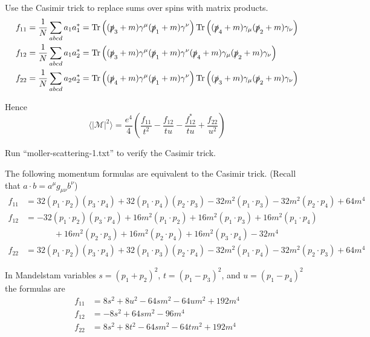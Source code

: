 \documentclass[12pt]{article}
\begin{document}
\noindent
Use the Casimir trick to replace sums over spins with matrix products.
\begin{align*}
f_{11}&=\frac{1}{N}\sum_{abcd}a_1a_1^*=
\mathop{\rm Tr}\left(
(\slashed{p}_3+m)\gamma^\mu(\slashed{p}_1+m)\gamma^\nu
\right)
\mathop{\rm Tr}\left(
(\slashed{p}_4+m)\gamma_\mu(\slashed{p}_2+m)\gamma_\nu
\right)
\\
f_{12}&=\frac{1}{N}\sum_{abcd}a_1a_2^*=
\mathop{\rm Tr}\left(
(\slashed{p}_3+m)\gamma^\mu(\slashed{p}_1+m)\gamma^\nu
(\slashed{p}_4+m)\gamma_\mu(\slashed{p}_2+m)\gamma_\nu
\right)
\\
f_{22}&=\frac{1}{N}\sum_{abcd}a_2a_2^*=
\mathop{\rm Tr}\left(
(\slashed{p}_4+m)\gamma^\mu(\slashed{p}_1+m)\gamma^\nu
\right)
\mathop{\rm Tr}\left(
(\slashed{p}_3+m)\gamma_\mu(\slashed{p}_2+m)\gamma_\nu
\right)
\end{align*}

\noindent
Hence
\begin{equation*}
\langle|\mathcal{M}|^2\rangle
=\frac{e^4}{4}
\left(
\frac{f_{11}}{t^2}-\frac{f_{12}}{tu}-\frac{f_{12}^*}{tu}+\frac{f_{22}}{u^2}
\right)
\end{equation*}

\noindent
Run ``moller-scattering-1.txt'' to verify the Casimir trick.

\bigskip
\noindent
The following momentum formulas are equivalent to the Casimir trick.
(Recall that $a\cdot b=a^\mu g_{\mu\nu}b^\nu$)
\begin{align*}
f_{11}&=
32 (p_1\cdot p_2) (p_3\cdot p_4) +
32 (p_1\cdot p_4) (p_2\cdot p_3) -
32 m^2 (p_1\cdot p_3) -
32 m^2 (p_2\cdot p_4) +
64 m^4
\\
f_{12}&=
-32 (p_1\cdot p_2) (p_3\cdot p_4)
+ 16 m^2 (p_1\cdot p_2) + 16 m^2 (p_1\cdot p_3) + 16 m^2 (p_1\cdot p_4) \\
&\phantom{=}\qquad{} + 16 m^2 (p_2\cdot p_3) + 16 m^2 (p_2\cdot p_4) + 16 m^2 (p_3\cdot p_4) - 32 m^4
\\
f_{22}&=
32 (p_1\cdot p_2) (p_3\cdot p_4) +
32 (p_1\cdot p_3) (p_2\cdot p_4) -
32 m^2 (p_1\cdot p_4) -
32 m^2 (p_2\cdot p_3) +
64 m^4
\end{align*}

\noindent
In Mandelstam variables $s=(p_1+p_2)^2$, $t=(p_1-p_3)^2$, and $u=(p_1-p_4)^2$ the formulas are
\begin{align*}
f_{11} &= 8 s^2 + 8 u^2 - 64 s m^2 - 64 u m^2 + 192 m^4
\\
f_{12} &= -8 s^2 + 64 s m^2 - 96 m^4
\\
f_{22} &= 8 s^2 + 8 t^2 - 64 s m^2 - 64 t m^2 + 192 m^4
\end{align*}
\end{document}
